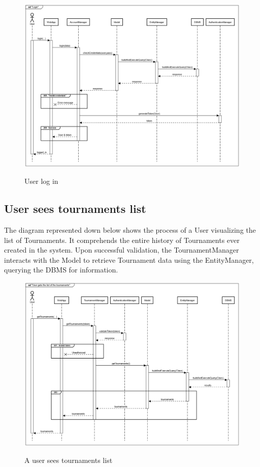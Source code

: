 \documentclass{Configuration_Files/Template}
\begin{document}
\begin{figure}[H]
\centering
\includegraphics[scale = 0.33]{Images/diagrams/sequences/UserLogsIn.png}\\
\caption{User log in}
\end{figure}

\subsection*{User sees tournaments list}

The diagram represented down below shows the process of a User visualizing the list of Tournaments. It comprehends the entire history of Tournaments ever created in the system. Upon successful validation, the TournamentManager interacts with the Model to retrieve Tournament data using the EntityManager, querying the DBMS for information.

\begin{figure}[H]
\centering
\includegraphics[scale = 0.33]{Images/diagrams/sequences/getTournaments.png}\\
\caption{A user sees tournaments list }
\end{figure}
\end{document}
